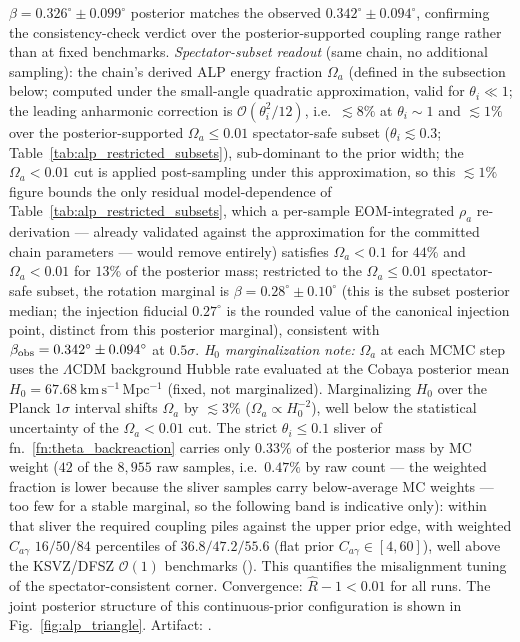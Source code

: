 \documentclass[aps,prd,twocolumn,superscriptaddress,showpacs,preprintnumbers,nofootinbib,longbibliography,floatfix]{revtex4-2}
\begin{document}
$\beta=0.326^\circ\pm0.099^\circ$ posterior matches the observed
$0.342^\circ\pm0.094^\circ$, confirming the consistency-check verdict over
the posterior-supported coupling range rather than at fixed benchmarks.
\emph{Spectator-subset readout} (same chain, no additional sampling): the
chain's derived ALP energy fraction $\Omega_a$ (defined in the subsection
below; computed under the small-angle quadratic approximation, valid for $\theta_i\ll 1$;
the leading anharmonic correction is $\mathcal{O}(\theta_i^2/12)$, i.e.\
$\lesssim 8\%$ at $\theta_i\sim 1$ and $\lesssim 1\%$ over the posterior-supported
$\Omega_a\le 0.01$ spectator-safe subset ($\theta_i\lesssim 0.3$;
Table~\ref{tab:alp_restricted_subsets}), sub-dominant to the prior width;
the $\Omega_a<0.01$ cut is applied post-sampling under this approximation,
so this $\lesssim1\%$ figure bounds the only residual model-dependence of
Table~\ref{tab:alp_restricted_subsets}, which a per-sample EOM-integrated
$\rho_a$ re-derivation --- already validated against the approximation for
the committed chain parameters --- would remove entirely)
satisfies $\Omega_a < 0.1$
for $44\%$ and $\Omega_a < 0.01$ for $13\%$ of the posterior mass;
restricted to the $\Omega_a \le 0.01$ spectator-safe subset, the rotation
marginal is $\beta = 0.28^\circ \pm 0.10^\circ$ (this is the subset posterior
median; the injection fiducial $0.27^\circ$ is the rounded value of the canonical
injection point, distinct from this posterior marginal), consistent with
$\beta_{\rm obs}=0.342^\circ\pm0.094^\circ$ at $0.5\sigma$.
\emph{H$_0$ marginalization note:} $\Omega_a$ at each MCMC step uses the $\Lambda$CDM background
Hubble rate evaluated at the Cobaya posterior mean $H_0 = 67.68~\mathrm{km\,s^{-1}\,Mpc^{-1}}$
(fixed, not marginalized). Marginalizing $H_0$ over the Planck $1\sigma$ interval
shifts $\Omega_a$ by $\lesssim 3\%$ ($\Omega_a \propto H_0^{-2}$), well below
the statistical uncertainty of the $\Omega_a < 0.01$ cut.
The strict $\theta_i \le 0.1$ sliver of fn.~\ref{fn:theta_backreaction} carries only
$0.33\%$ of the posterior mass by MC weight ($42$ of the $8{,}955$ raw
samples, i.e.\ $0.47\%$ by raw count --- the weighted fraction is lower
because the sliver samples carry below-average MC weights --- too few for
a stable marginal, so the following band is indicative only): within that sliver the required coupling piles against
the upper prior edge, with weighted $C_{a\gamma}$ $16/50/84$ percentiles
of $36.8/47.2/55.6$ (flat prior $C_{a\gamma}\in[4,60]$), well above the
KSVZ/DFSZ $\mathcal{O}(1)$ benchmarks
().
This quantifies the misalignment tuning of the spectator-consistent corner.
Convergence:
$\hat{R}-1 < 0.01$ for all runs. The joint posterior structure of this
continuous-prior configuration is shown in Fig.~\ref{fig:alp_triangle}.
Artifact: .
\end{document}
